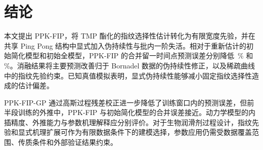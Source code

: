 \section{结论}
本文提出 PPK-FIP，将 TMP 酯化的指纹选择性估计转化为有限宽度先验，并在共享 Ping Pong 结构中显式加入伪持续性与批内一阶失活。相对于重新估计的初始简化模型和初始全模型，PPK-FIP 的合并留一时间点预测误差分别降低 \LotoAllRedOrig\,\% 和 \LotoAllRedFull\,\%。消融结果将主要预测改善归于 Bornadel 数据的伪持续性修正，以及稀疏曲线中的指纹先验约束。已知真值模拟表明，显式伪持续性能够减小固定指纹选择性造成的估计偏差。

PPK-FIP-GP 通过高斯过程残差校正进一步降低了训练窗口内的预测误差，但前半段训练的外推中，PPK-FIP 与初始简化模型的合并误差接近。动力学模型的内插精度、外推能力与参数机理解释应分别评价。对于生物润滑剂过程设计，指纹先验和显式机理扩展可作为有限数据条件下的建模选择，参数应用仍需受数据覆盖范围、传质条件和外部验证结果约束。
